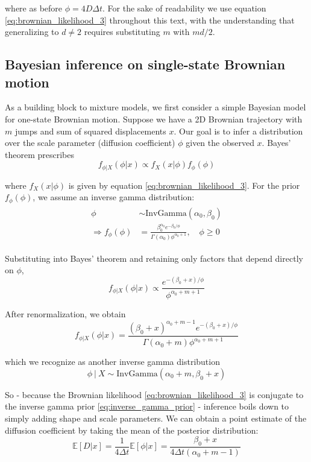 \documentclass{article}
\begin{document}
where as before $\phi = 4 D \Delta t$.
For the sake of readability we use equation \ref{eq:brownian_likelihood_3}
throughout this text, with the understanding that generalizing to $d \neq 2$
requires substituting $m$ with $md / 2$.

\subsection{Bayesian inference on single-state Brownian motion}

As a building block to mixture models, we first consider a simple
Bayesian model for one-state Brownian motion. Suppose we have a
2D Brownian trajectory with $m$ jumps and sum of squared displacements $x$.
Our goal is to infer a distribution over the scale parameter (diffusion
coefficient) $\phi$ given the observed $x$. Bayes' theorem prescribes
\[
    f_{\phi | X}(\phi | x) \propto f_{X}(x | \phi) f_{\phi}(\phi)
\]

where $f_{X}(x | \phi)$ is given by equation \ref{eq:brownian_likelihood_3}.
For the prior $f_{\phi}(\phi)$, we assume an inverse gamma distribution:
\begin{align}\begin{split}\label{eq:inverse_gamma_prior}
    \phi &\sim \text{InvGamma} \left( \alpha_{0}, \beta_{0} \right) \\
    \Rightarrow f_{\phi} \left( \phi \right) &= \frac{\beta_{0}^{\alpha_{0}} e^{-\beta_{0} / \phi}}{\Gamma \left( \alpha_{0} \right) \phi^{\alpha_{0} + 1} }, \quad \phi \geq 0
\end{split}\end{align}

Substituting into Bayes' theorem and retaining only factors that depend
directly on $\phi$,
\[
    f_{\phi | X} (\phi | x) \propto \frac{
        e^{-(\beta_{0} + x) / \phi}
    }{
        \phi^{\alpha_{0} + m + 1}
    }
\]

After renormalization, we obtain
\[
    f_{\phi | X} (\phi | x) = \frac{ (\beta_{0} + x)^{\alpha_{0}+m-1} e^{-(\beta_{0} + x) / \phi}}{\Gamma (\alpha_{0} + m) \phi^{\alpha_{0} + m + 1}}
\]

which we recognize as another inverse gamma distribution
\[
    \phi \ | \ X \sim \text{InvGamma} \left( \alpha_{0} + m, \beta_{0} + x \right)
\]

So - because the Brownian likelihood \ref{eq:brownian_likelihood_3} is conjugate to the inverse gamma prior \ref{eq:inverse_gamma_prior} -
inference boils down to simply adding
shape and scale parameters. We can obtain a point estimate of the
diffusion coefficient by taking the mean of the posterior distribution:
\[
    \mathbb{E} \left[ D | x \right] = \frac{1}{4 \Delta t} \mathbb{E} \left[ \phi | x \right] = \frac{\beta_{0} + x}{4 \Delta t \left( \alpha_{0} + m - 1 \right)}
\]
\end{document}
